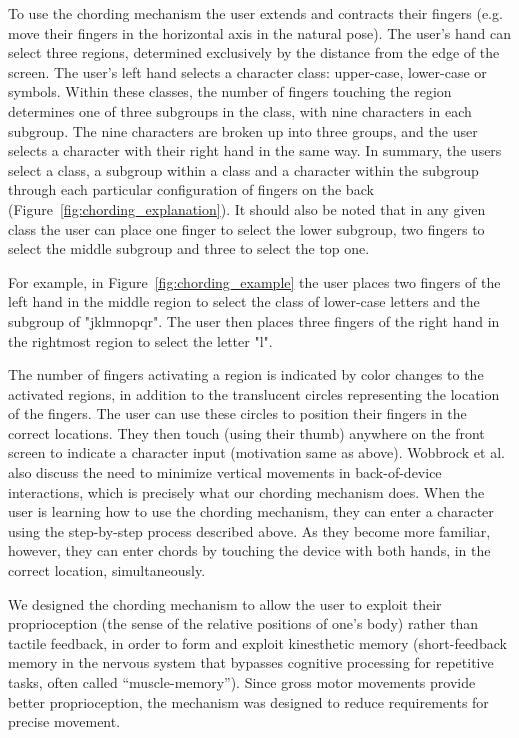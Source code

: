 To use the chording mechanism the user extends and contracts their
fingers (e.g. move their fingers in the horizontal axis in the natural
pose). The user's hand can select three regions, determined
exclusively by the distance from the edge of the screen. The user's
left hand selects a character class: upper-case, lower-case or
symbols. Within these classes, the number of fingers touching the
region determines one of three subgroups in the class, with nine
characters in each subgroup. The nine characters are broken up into
three groups, and the user selects a character with their right hand
in the same way. In summary, the users select a class, a subgroup
within a class and a character within the subgroup through each
particular configuration of fingers on the back
(Figure~\ref{fig:chording_explanation}). It should also be noted that
in any given class the user can place one finger to select the lower
subgroup, two fingers to select the middle subgroup and three to
select the top one.

For example, in Figure~\ref{fig:chording_example} the user places two fingers of the left hand in the middle region to select the class of lower-case letters and the subgroup of "jklmnopqr". The user then places three fingers of the right hand in the rightmost region to select the letter "l".

The number of fingers activating a region is indicated by color
changes to the activated regions, in addition to the translucent
circles representing the location of the fingers. The user can use
these circles to position their fingers in the correct locations. They
then touch (using their thumb) anywhere on the front screen to
indicate a character input (motivation same as above). Wobbrock et
al. \cite{Wobbrock} also discuss the need to minimize vertical
movements in back-of-device interactions, which is precisely what our
chording mechanism does.  When the user is learning how to use the
chording mechanism, they can enter a character using the step-by-step
process described above.  As they become more familiar, however, they
can enter chords by touching the device with both hands, in the
correct location, simultaneously.

We designed the chording mechanism to allow the user to exploit their
proprioception (the sense of the relative positions of one's body)
rather than tactile feedback, in order to form and exploit kinesthetic
memory (short-feedback memory in the nervous system that bypasses
cognitive processing for repetitive tasks, often called
``muscle-memory''). Since gross motor movements provide better
proprioception, the mechanism was designed to reduce requirements for
precise movement.



